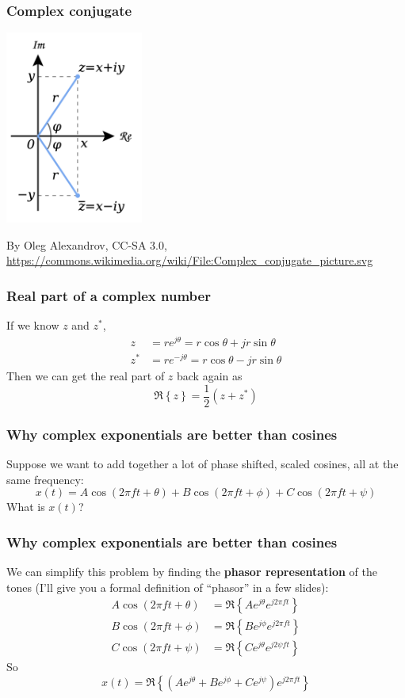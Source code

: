 \documentclass{beamer}
\begin{document}
\begin{frame}
  \frametitle{Complex conjugate}

  \centerline{\includegraphics[height=2.5in]{Complex_conjugate_picture.png}}
  \begin{tiny}
    By Oleg Alexandrov, CC-SA 3.0,
    \url{https://commons.wikimedia.org/wiki/File:Complex_conjugate_picture.svg}
  \end{tiny}
\end{frame}

\begin{frame}
  \frametitle{Real part of a complex number}

  If we know $z$ and $z^*$,
  \begin{align*}
  z &= re^{j\theta} = r\cos\theta + jr\sin\theta\\
  z^* &= re^{-j\theta} = r\cos\theta - jr\sin\theta
  \end{align*}
  Then we can get the real part of $z$ back again as
  \[
  \Re\left\{z\right\} = \frac{1}{2}\left(z+z^*\right)
  \]
\end{frame}

\begin{frame}
  \frametitle{Why complex exponentials are better than cosines}

  Suppose we want to add together a lot of phase shifted, scaled
  cosines, all at the same frequency:
  \[
  x(t) = A\cos\left(2\pi ft+\theta\right)+B\cos\left(2\pi ft+\phi\right)+C\cos\left(2\pi ft+\psi\right)
  \]
  What is $x(t)$?
\end{frame}

\begin{frame}
  \frametitle{Why complex exponentials are better than cosines}

  We can simplify this problem by finding the {\bf phasor
    representation} of the tones (I'll give you a formal definition of
  ``phasor'' in a few slides):
  \begin{align*}
    A\cos\left(2\pi ft+\theta\right) &= \Re\left\{Ae^{j\theta}e^{j2\pi ft}\right\}\\
    B\cos\left(2\pi ft+\phi\right) &= \Re\left\{Be^{j\phi}e^{j2\pi ft}\right\}\\
    C\cos\left(2\pi ft+\psi\right) &= \Re\left\{Ce^{j\theta}e^{j2\psi ft}\right\}
  \end{align*}
  So
  \[
  x(t) = \Re\left\{\left(Ae^{j\theta}+Be^{j\phi}+Ce^{j\psi}\right)e^{j2\pi ft}\right\}
  \]
\end{frame}
\end{document}
